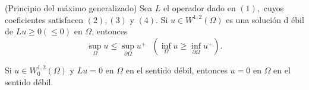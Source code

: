 

\begin{theorem}
(Principio del m\'{a}ximo generalizado) Sea $L$ el operador dado en $(1),$
cuyos coeficientes satisfacen $\left( 2\right) ,\left( 3\right) $ y $\left(
4\right) $. Si $u\in W^{1,2}\left( \Omega \right) $ es una soluci\'{o}n d%
\'{e}bil de $Lu\geq 0\left( \leq 0\right) $ en $\Omega $, entonces
\begin{equation*}
\sup_{\Omega }u\leq \sup_{\partial \Omega }u^{+}\text{ \ }\left(
\inf_{\Omega }u\geq \inf_{\partial \Omega }u^{+}\right) .
\end{equation*}
\end{theorem}


\begin{corollary}
Si $u\in W_{0}^{1,2}\left( \Omega \right) $ y $Lu=0$ en $\Omega $ en el
sentido d\'{e}bil, entonces $u=0$ en $\Omega $ en el sentido d\'{e}bil.
\end{corollary}
